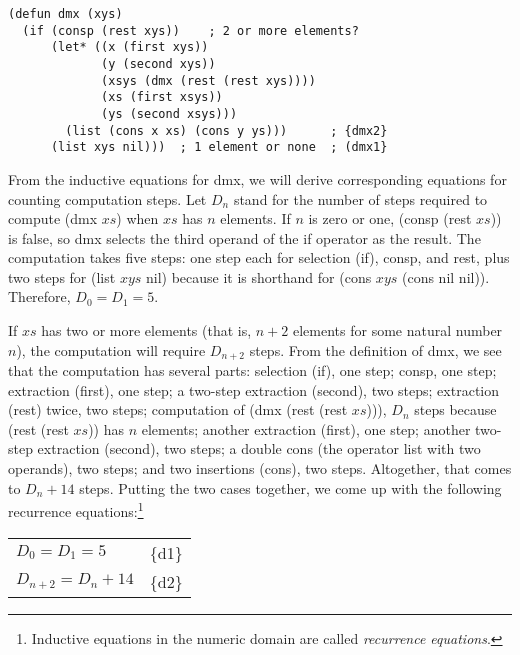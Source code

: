 \label{defun:dmx-copy}
\begin{code}
\begin{verbatim}
(defun dmx (xys)
  (if (consp (rest xys))    ; 2 or more elements?
      (let* ((x (first xys))
             (y (second xys))
             (xsys (dmx (rest (rest xys))))
             (xs (first xsys))
             (ys (second xsys)))
        (list (cons x xs) (cons y ys)))      ; {dmx2}
      (list xys nil)))  ; 1 element or none  ; (dmx1}
\end{verbatim}
\end{code}

From the inductive equations for \textsf{dmx},
we will derive corresponding equations for counting computation steps.
Let $D_n$ stand for the number of steps required
to compute \textsf{(dmx $xs$)} when $xs$ has $n$ elements.
If $n$ is zero or one, \textsf{(consp (rest $xs$))} is false,
so \textsf{dmx} selects the third operand of the \textsf{if}
operator as the result.
The computation takes five steps: one step each for selection (\textsf{if}),
\textsf{consp}, and \textsf{rest},
plus two steps for \textsf{(list $xys$ nil)}
because it is shorthand for \textsf{(cons $xys$ (cons nil nil))}.
Therefore, $D_0 = D_1 = 5$.

If $xs$ has two or more elements (that is, $n+2$ elements
for some natural number $n$),
the computation will require $D_{n+2}$ steps.
From the definition of \textsf{dmx}, we see that the computation
has several parts:
selection (\textsf{if}), one step;
\textsf{consp}, one step;
extraction (\textsf{first}), one step;
a two-step extraction (\textsf{second}), two steps;
extraction (\textsf{rest}) twice, two steps;
computation of \textsf{(dmx (rest (rest $xs$)))},
$D_n$ steps because \textsf{(rest (rest $xs$))} has $n$ elements;
another extraction (\textsf{first}), one step;
another two-step extraction (\textsf{second}), two steps;
a double \textsf{cons}
(the operator \textsf{list} with two operands), two steps;
and two insertions (\textsf{cons}), two steps.
Altogether, that comes to $D_n + 14$ steps.
Putting the two cases together,
we come up with the following recurrence equations:\footnote{Inductive
equations in the numeric domain are called
\label{def:recurrence-equations}\emph{recurrence equations}.}\\[-6mm]
\begin{center}
\begin{tabular}{ll}
  $D_0 = D_1 = 5$      & \{d1\} \\
  $D_{n+2} = D_n + 14$ & \{d2\} \\
\end{tabular}
\end{center}

